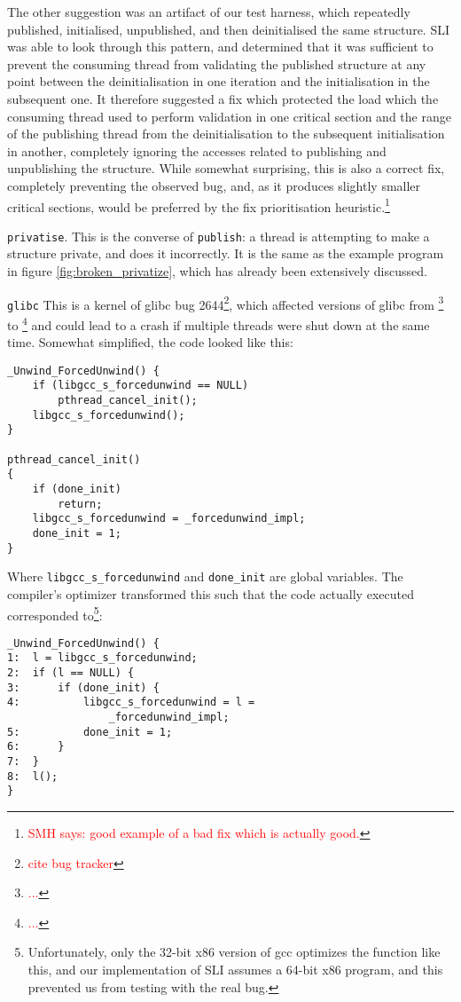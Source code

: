 \documentclass[10pt,twocolumn,preprint,natbib,authoryear]{sigplanconf}
\newcommand{\editorial}[1]{\textcolor{red}{\footnote{\textcolor{red}{#1}}}}
\newcommand{\smh}[1]{\editorial{SMH says: #1}}
\begin{document}
The other suggestion was an artifact of our test harness, which
repeatedly published, initialised, unpublished, and then deinitialised
the same structure.  SLI was able to look through this pattern, and
determined that it was sufficient to prevent the consuming thread from
validating the published structure at any point between the
deinitialisation in one iteration and the initialisation in the
subsequent one.  It therefore suggested a fix which protected the load
which the consuming thread used to perform validation in one critical
section and the range of the publishing thread from the
deinitialisation to the subsequent initialisation in another,
completely ignoring the accesses related to publishing and
unpublishing the structure.  While somewhat surprising, this is also a
correct fix, completely preventing the observed bug, and, as it
produces slightly smaller critical sections, would be preferred by the
fix prioritisation heuristic.\smh{good example of a bad fix which is
  actually good.}

\verb|privatise|.  This is the converse of \verb|publish|: a thread is
attempting to make a structure private, and does it incorrectly.  It
is the same as the example program in figure
\ref{fig:broken_privatize}, which has already been extensively
discussed.

\verb|glibc| This is a kernel of glibc bug 2644\editorial{cite bug
  tracker}, which affected versions of glibc from \editorial{...}  to
\editorial{...} and could lead to a crash if multiple threads were
shut down at the same time.  Somewhat simplified, the code looked like
this:

\begin{verbatim}
_Unwind_ForcedUnwind() {
    if (libgcc_s_forcedunwind == NULL)
        pthread_cancel_init();
    libgcc_s_forcedunwind();
}

pthread_cancel_init()
{
    if (done_init)
        return;
    libgcc_s_forcedunwind = _forcedunwind_impl;
    done_init = 1;
}
\end{verbatim}

Where \verb|libgcc_s_forcedunwind| and \verb|done_init| are global
variables.  The compiler's optimizer transformed this such that the
code actually executed corresponded to\footnote{Unfortunately, only
  the 32-bit x86 version of gcc optimizes the function like this, and
  our implementation of SLI assumes a 64-bit x86 program, and this
  prevented us from testing with the real bug.}:

\begin{verbatim}
_Unwind_ForcedUnwind() {
1:  l = libgcc_s_forcedunwind;
2:  if (l == NULL) {
3:      if (done_init) {
4:          libgcc_s_forcedunwind = l =
                _forcedunwind_impl;
5:          done_init = 1;
6:      }
7:  }
8:  l();
}
\end{verbatim}
\end{document}
